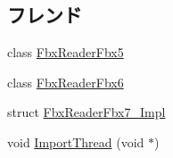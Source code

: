 \subsection*{フレンド}
\begin{DoxyCompactItemize}
\item 
class \hyperlink{class_fbx_importer_a66e1b4e7536dcd24ce7d7f48cf6b6e65}{Fbx\+Reader\+Fbx5}
\item 
class \hyperlink{class_fbx_importer_a7f8cca9f018e4d952710060c08cc3983}{Fbx\+Reader\+Fbx6}
\item 
struct \hyperlink{class_fbx_importer_a825b5c450dc04c4042a16fa36d3641c3}{Fbx\+Reader\+Fbx7\+\_\+\+Impl}
\item 
void \hyperlink{class_fbx_importer_aa8465892e0c998ae0aa1ddc6e1ee8552}{Import\+Thread} (void $\ast$)
\end{DoxyCompactItemize}
